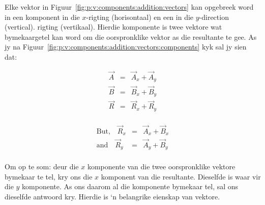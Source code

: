 Elke vektor in Figuur~\ref{fig:p:v:components:addition:vectors} kan opgebreek word in een komponent in die $x$-rigting (horisontaal) en een in die $y$-direction (vertical). rigting (vertikaal). Hierdie komponente is twee vektore wat bymekaargetel kan word om die oorspronklike vektor as die resultante te gee. As jy na Figuur~\ref{fig:p:v:components:addition:vectors:components} kyk sal jy sien dat:

\begin{minipage}{0.5\textwidth}
\begin{eqnarray*}
\vec{A}&=&\vec{A}_x+\vec{A}_y\\
\vec{B}&=&\vec{B}_x+\vec{B}_y\\
\vec{R}&=&\vec{R}_x+\vec{R}_y\\
\end{eqnarray*}
\end{minipage}
\begin{minipage}{0.5\textwidth}
\begin{eqnarray*}
\mbox{But,}\quad \vec{R}_x&=&\vec{A}_x+\vec{B}_x\\
\mbox{and}\quad\vec{R}_y&=&\vec{A}_y+\vec{B}_y\\
\end{eqnarray*}
\end{minipage}

Om op te som: deur die $x$ komponente van die twee oorspronklike vektore bymekaar te tel, kry ons die $x$ komponent van die resultante. Dieselfde is waar vir die $y$ komponente. As ons daarom al die komponente bymekaar tel, sal ons dieselfde antwoord kry. Hierdie is ‘n belangrike eienskap van vektore.

